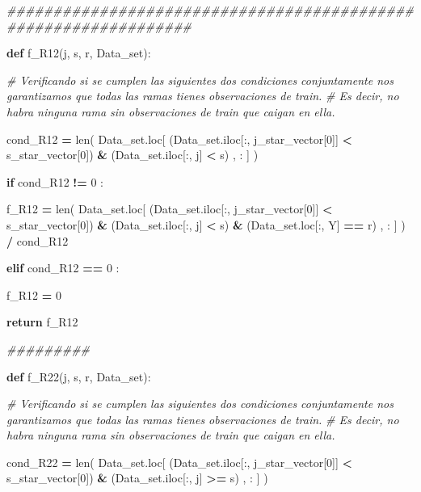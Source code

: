 \documentclass[
  11pt,
  a4paper,
]{article}
\newenvironment{Shaded}{\begin{snugshade}}{\end{snugshade}}
\newcommand{\BuiltInTok}[1]{#1}
\newcommand{\CommentTok}[1]{\textcolor[rgb]{0.56,0.35,0.01}{\textit{#1}}}
\newcommand{\ControlFlowTok}[1]{\textcolor[rgb]{0.13,0.29,0.53}{\textbf{#1}}}
\newcommand{\DecValTok}[1]{\textcolor[rgb]{0.00,0.00,0.81}{#1}}
\newcommand{\KeywordTok}[1]{\textcolor[rgb]{0.13,0.29,0.53}{\textbf{#1}}}
\newcommand{\NormalTok}[1]{#1}
\newcommand{\OperatorTok}[1]{\textcolor[rgb]{0.81,0.36,0.00}{\textbf{#1}}}
\newcommand{\StringTok}[1]{\textcolor[rgb]{0.31,0.60,0.02}{#1}}
\begin{document}
\begin{Shaded}
\begin{Highlighting}[]
    \CommentTok{\#\#\#\#\#\#\#\#\#\#\#\#\#\#\#\#\#\#\#\#\#\#\#\#\#\#\#\#\#\#\#\#\#\#\#\#\#\#\#\#\#\#\#\#\#\#\#\#\#\#\#\#\#\#\#\#\#\#\#\#\#\#\#\#}


        \KeywordTok{def}\NormalTok{ f\_R12(j, s, r, Data\_set):}

           \CommentTok{\# Verificando si se cumplen las siguientes dos condiciones conjuntamente nos garantizamos que todas las ramas tienes observaciones de train. }
           \CommentTok{\# Es decir, no habra ninguna rama sin observaciones de train que caigan en ella.}

\NormalTok{            cond\_R12 }\OperatorTok{=} \BuiltInTok{len}\NormalTok{( Data\_set.loc[ (Data\_set.iloc[:, j\_star\_vector[}\DecValTok{0}\NormalTok{]] }\OperatorTok{\textless{}}\NormalTok{ s\_star\_vector[}\DecValTok{0}\NormalTok{]) }\OperatorTok{\&}\NormalTok{ (Data\_set.iloc[:, j] }\OperatorTok{\textless{}}\NormalTok{ s) , : ] ) }

            \ControlFlowTok{if}\NormalTok{  cond\_R12 }\OperatorTok{!=} \DecValTok{0}\NormalTok{ :}

\NormalTok{                f\_R12 }\OperatorTok{=} \BuiltInTok{len}\NormalTok{( Data\_set.loc[ (Data\_set.iloc[:, j\_star\_vector[}\DecValTok{0}\NormalTok{]] }\OperatorTok{\textless{}}\NormalTok{ s\_star\_vector[}\DecValTok{0}\NormalTok{]) }\OperatorTok{\&}\NormalTok{ (Data\_set.iloc[:, j] }\OperatorTok{\textless{}}\NormalTok{ s) }\OperatorTok{\&}\NormalTok{ (Data\_set.loc[:, }\StringTok{\textquotesingle{}Y\textquotesingle{}}\NormalTok{] }\OperatorTok{==}\NormalTok{ r) , : ] ) }\OperatorTok{/}\NormalTok{ cond\_R12}

            
            \ControlFlowTok{elif}\NormalTok{ cond\_R12 }\OperatorTok{==} \DecValTok{0}\NormalTok{ :}

\NormalTok{                f\_R12 }\OperatorTok{=} \DecValTok{0}

            
            \ControlFlowTok{return}\NormalTok{ f\_R12 }

        \CommentTok{\#\#\#\#\#\#\#\#\#}

        \KeywordTok{def}\NormalTok{ f\_R22(j, s, r, Data\_set):}

           \CommentTok{\# Verificando si se cumplen las siguientes dos condiciones conjuntamente nos garantizamos que todas las ramas tienes observaciones de train. }
           \CommentTok{\# Es decir, no habra ninguna rama sin observaciones de train que caigan en ella.}

\NormalTok{            cond\_R22 }\OperatorTok{=} \BuiltInTok{len}\NormalTok{( Data\_set.loc[ (Data\_set.iloc[:, j\_star\_vector[}\DecValTok{0}\NormalTok{]] }\OperatorTok{\textless{}}\NormalTok{ s\_star\_vector[}\DecValTok{0}\NormalTok{]) }\OperatorTok{\&}\NormalTok{ (Data\_set.iloc[:, j] }\OperatorTok{\textgreater{}=}\NormalTok{ s) , : ] ) }


\end{Highlighting}
\end{Shaded}
\end{document}
